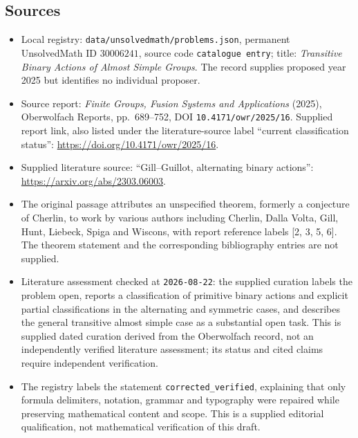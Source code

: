 \documentclass[11pt]{article}
\begin{document}
\subsection{Sources}
\begin{itemize}
\item Local registry: \texttt{data/unsolvedmath/problems.json}, permanent UnsolvedMath ID \(30006241\), source code \texttt{catalogue entry}; title: \emph{Transitive Binary Actions of Almost Simple Groups}. The record supplies proposed year 2025 but identifies no individual proposer.
\item Source report: \emph{Finite Groups, Fusion Systems and Applications} (2025), Oberwolfach Reports, pp.\ 689--752, DOI \texttt{10.4171/owr/2025/16}. Supplied report link, also listed under the literature-source label ``current classification status'': \url{https://doi.org/10.4171/owr/2025/16}.
\item Supplied literature source: ``Gill--Guillot, alternating binary actions'': \url{https://arxiv.org/abs/2303.06003}.
\item The original passage attributes an unspecified theorem, formerly a conjecture of Cherlin, to work by various authors including Cherlin, Dalla Volta, Gill, Hunt, Liebeck, Spiga and Wiscons, with report reference labels [2, 3, 5, 6]. The theorem statement and the corresponding bibliography entries are not supplied.
\item Literature assessment checked at \texttt{2026-08-22}: the supplied curation labels the problem open, reports a classification of primitive binary actions and explicit partial classifications in the alternating and symmetric cases, and describes the general transitive almost simple case as a substantial open task. This is supplied dated curation derived from the Oberwolfach record, not an independently verified literature assessment; its status and cited claims require independent verification.
\item The registry labels the statement \texttt{corrected\_verified}, explaining that only formula delimiters, notation, grammar and typography were repaired while preserving mathematical content and scope. This is a supplied editorial qualification, not mathematical verification of this draft.
\end{itemize}
\end{document}
